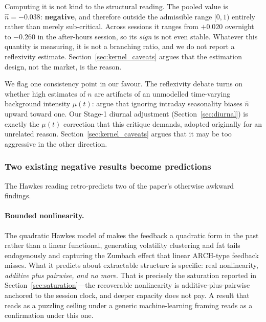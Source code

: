 Computing it is not kind to the structural reading.
 The
pooled value is $\hat n = -0.038$: \textbf{negative}, and therefore outside the
admissible range $[0, 1)$ entirely rather than merely sub-critical. Across
sessions it ranges from $+0.020$ overnight to $-0.260$ in the after-hours
session, so its \emph{sign} is not even stable. Whatever this quantity is
measuring, it is not a branching ratio, and we do not report a reflexivity
estimate. Section~\ref{sec:kernel_caveats} argues that the estimation design,
not the market, is the reason.

We flag one consistency point in our favour. The reflexivity debate turns on
whether high estimates of $n$ are artifacts of an unmodelled time-varying
background intensity $\mu(t)$: \citet{FilimonovSornette2012} argue that
ignoring intraday seasonality biases $\hat n$ upward toward one. Our Stage-1
diurnal adjustment (Section~\ref{sec:diurnal}) is exactly the $\mu(t)$
correction that this critique demands, adopted originally for an unrelated
reason. Section~\ref{sec:kernel_caveats} argues that it may be too aggressive
in the other direction.

\subsubsection{Two existing negative results become predictions}

The Hawkes reading retro-predicts two of the paper's otherwise awkward
findings.

\paragraph{Bounded nonlinearity.} The quadratic Hawkes model of
\citet{BlancDonierBouchaud2017} makes the feedback a quadratic form in the
past rather than a linear functional, generating volatility clustering and fat
tails endogenously and capturing the Zumbach effect that linear ARCH-type
feedback misses. What it predicts about extractable structure is specific:
real nonlinearity, \emph{additive plus pairwise, and no more}. That is
precisely the saturation reported in Section~\ref{sec:saturation}---the
recoverable nonlinearity is additive-plus-pairwise anchored to the session
clock, and deeper capacity does not pay. A result that reads as a puzzling
ceiling under a generic machine-learning framing reads as a confirmation under
this one.

